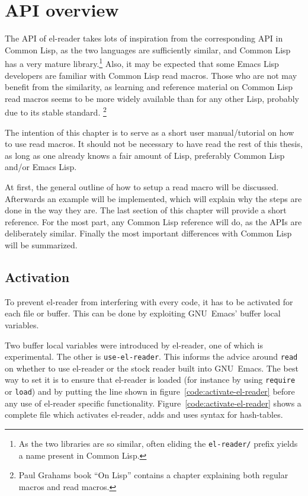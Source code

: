 \documentclass[a4paper,10pt,twoside]{report}
\newcommand{\el}{Emacs Lisp}
\newcommand{\cl}{Common Lisp}
\newcommand{\elr}{el-reader}
\newcommand{\sym}[1]{\texttt{#1}}
\newcommand{\fun}[1]{\texttt{#1}}
\newcommand{\emacs}{GNU~Emacs}
\newcommand{\Read}{\fun{read}}
\begin{document}
\chapter{API overview}
\label{chapter:api-overview}

The API of \elr{} takes lots of inspiration from the corresponding API in \cl{},
as the two languages are sufficiently similar, and \cl{} has a very mature
library.\footnote{As the two libraries are so similar, often eliding the
  \sym{el-reader/} prefix yields a name present in \cl{}.}  Also, it may be
expected that some \el{} developers are familiar with \cl{} read macros.  Those
who are not may benefit from the similarity, as learning and reference material
on \cl{} read macros seems to be more widely available than for any other Lisp,
probably due to its stable standard.  \footnote{Paul Grahams book ``On
  Lisp''\cite[p.~224]{on-lisp} contains a chapter explaining both regular macros
  and read macros.}

The intention of this chapter is to serve as a short user manual/tutorial on how
to use read macros.  It should not be necessary to have read the rest of this
thesis, as long as one already knows a fair amount of Lisp, preferably \cl{}
and/or \el{}.

At first, the general outline of how to setup a read macro will be discussed.
Afterwards an example will be implemented, which will explain why the steps are
done in the way they are.  The last section of this chapter will provide a short
reference.  For the most part, any \cl{} reference will do, as the APIs are
deliberately similar.  Finally the most important differences with \cl{} will be
summarized.

\section{Activation}
\label{sec:activation}

To prevent \elr{} from interfering with every code, it has to be activated for
each file or buffer.  This can be done by exploiting \emacs{}’ buffer local
variables\cite[11.10 ``Buffer-Local Variables'']{elisp-reference}.

Two buffer local variables were introduced by \elr{}, one of which is
experimental.  The other is \sym{use-el-reader}.  This informs the advice around
\Read{} on whether to use \elr{} or the stock reader built into \emacs{}.  The
best way to set it is to ensure that \elr{} is loaded (for instance by using
\sym{require} or \sym{load})\cite[15 ``Loading'']{elisp-reference} and by
putting the line shown in figure~\ref{code:activate-el-reader} before any use of
\elr{} specific functionality.  Figure~\ref{code:activate-el-reader} shows a
complete file which activates \elr{}, adds and uses syntax for hash-tables.
\end{document}
